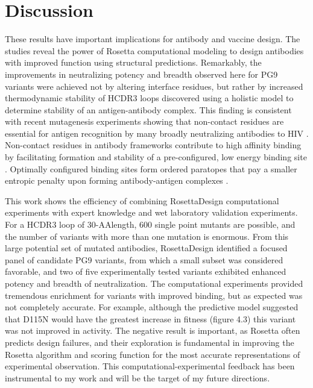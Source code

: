 
\section{Discussion}
These results have important implications for antibody and vaccine design. The studies reveal the power of Rosetta computational modeling to design antibodies with improved function using structural predictions. Remarkably, the improvements in neutralizing potency and breadth observed here for PG9 variants were achieved not by altering interface residues, but rather by increased thermodynamic stability of HCDR3 loops discovered using a holistic model to determine stability of an antigen-antibody complex. This finding is consistent with recent mutagenesis experiments showing that non-contact residues are essential for antigen recognition by many broadly neutralizing antibodies to HIV \citep{Klein:2013iz}. Non-contact residues in antibody frameworks contribute to high affinity binding by facilitating formation and stability of a pre-configured, low energy binding site \citep{Willis:2013dd,Manivel:2000wk,Marlow:2010jl,Wedemayer:1997wn,Schmidt:2013ka}. Optimally configured binding sites form ordered paratopes that pay a smaller entropic penalty upon forming antibody-antigen complexes \citep{Marlow:2010jl}.

This work shows the efficiency of combining RosettaDesign computational experiments with expert knowledge and wet laboratory validation experiments. For a HCDR3 loop of 30-AAlength, 600 single point mutants are possible, and the number of variants with more than one mutation is enormous. From this large potential set of mutated antibodies, RosettaDesign identified a focused panel of candidate PG9 variants, from which a small subset was considered favorable, and two of five experimentally tested variants exhibited enhanced potency and breadth of neutralization. The computational experiments provided tremendous enrichment for variants with improved binding, but as expected was not completely accurate. For example, although the predictive model suggested that D115N would have the greatest increase in fitness (figure 4.3) this variant was not improved in activity.
The negative result is important, as Rosetta often predicts design failures, and their exploration is fundamental in improving the Rosetta algorithm and scoring function for the most accurate representations of experimental observation. This computational-experimental feedback has been instrumental to my work and will be the target of my future directions.

